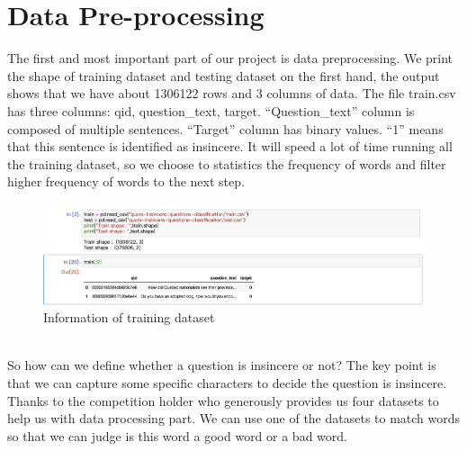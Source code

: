 \documentclass{article}
\begin{document}
\section{ Data Pre-processing}
\noindent The first and most important part of our project is data preprocessing.  We print the shape of training dataset and testing dataset on the first hand, the output shows that we have about 1306122 rows and 3 columns of data. The file train.csv has three columns: qid, question\_text, target. “Question\_text” column is composed of multiple sentences. “Target” column has binary values. “1” means that this sentence is identified as insincere. It will speed a lot of time running all the training dataset, so we choose to statistics the frequency of words and filter higher frequency of words to the next step.\\
\begin{figure}[h]
	\centering
	\includegraphics[scale = 0.15]{n1.jpeg}
	\caption{Information of training dataset
		}
\end{figure}\\
\noindent So how can we define whether a question is insincere or not? The key point is that we can capture some specific characters to decide the question is insincere. Thanks to the competition holder who generously provides us four datasets to help us with data processing part. We can use one of the datasets to match words so that we can judge is this word a good word or a bad word.\\
\end{document}
